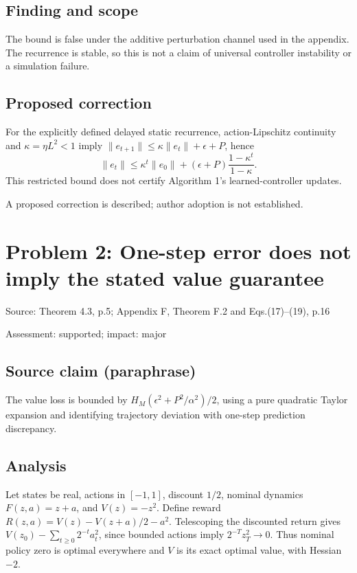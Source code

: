 \documentclass[11pt]{article}
\begin{document}
\subsection*{Finding and scope}

The bound is false under the additive perturbation channel used in the appendix. The recurrence is stable, so this is not a claim of universal controller instability or a simulation failure.

\subsection*{Proposed correction}

For the explicitly defined delayed static recurrence, action-Lipschitz continuity and \(\kappa=\eta L^2<1\) imply \(\|e_{t+1}\|\le\kappa\|e_t\|+\epsilon+P\), hence \[\|e_t\|\le\kappa^t\|e_0\|+(\epsilon+P)\frac{1-\kappa^t}{1-\kappa}.\] This restricted bound does not certify Algorithm 1’s learned-controller updates.

A proposed correction is described; author adoption is not established.

\section*{Problem 2: One-step error does not imply the stated value guarantee}

Source: Theorem 4.3, p.5; Appendix F, Theorem F.2 and Eqs.(17)–(19), p.16

Assessment: supported; impact: major

\subsection*{Source claim (paraphrase)}

The value loss is bounded by \(H_M(\epsilon^2+P^2/\alpha^2)/2\), using a pure quadratic Taylor expansion and identifying trajectory deviation with one-step prediction discrepancy.

\subsection*{Analysis}

Let states be real, actions in \([-1,1]\), discount \(1/2\), nominal dynamics \(F(z,a)=z+a\), and \(V(z)=-z^2\). Define reward \(R(z,a)=V(z)-V(z+a)/2-a^2\). Telescoping the discounted return gives \(V(z_0)-\sum_{t\ge0}2^{-t}a_t^2\), since bounded actions imply \(2^{-T}z_T^2\to0\). Thus nominal policy zero is optimal everywhere and \(V\) is its exact optimal value, with Hessian \(-2\).
\end{document}
